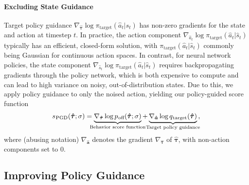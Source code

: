 \documentclass[10pt]{article} %
\theoremstyle{plain}
\theoremstyle{definition}
\theoremstyle{remark}
\newcommand{\qtarg}{q_{\mkern1mu\text{target}}}
\newcommand{\poff}{p_{\mkern1mu\text{off}}}
\begin{document}
\paragraph{Excluding State Guidance}
Target policy guidance $\nabla_{\bm{\hat{\tau}}}\log \pi_{\text{target}}\left(\hat{a}_t|\hat{s}_t\right)$ has non-zero gradients for the state and action at timestep $t$.
In practice, the action component $\nabla_{\hat{a}_t} \log \pi_{\text{target}}\left(\hat{a}_t|\hat{s}_t\right)$ typically has an efficient, closed-form solution, with $\pi_{\text{target}}\left(\hat{a}_t|\hat{s}_t\right)$ commonly being Gaussian for continuous action spaces. In contrast, for neural network policies, the state component $\nabla_{\hat{s}_t} \log \pi_{\text{target}}\left(\hat{a}_t|\hat{s}_t\right)$ requires backpropagating gradients through the policy network, which is both expensive to compute and can lead to high variance on noisy, out-of-distribution states.
Due to this, we apply policy guidance to only the noised action, yielding our policy-guided score function
\begin{align}
    s_{\mkern 1mu \text{PGD}}(\bm{\hat{\tau}};\sigma) = \underbrace{\nabla_{\bm{\hat{\tau}}}\log \poff(\bm{\hat{\tau}};\sigma)}_{\mathclap{\text{Behavior score function}}} + \underbrace{\nabla_{\bm{\hat{a}}} \log \qtarg(\bm{\hat{\tau}})}_{\mathclap{\text{Target policy guidance}}} \text{,} \label{eq:pgd-score}
\end{align}
where (abusing notation) $\nabla_{\bm{\hat{a}}}$ denotes the gradient $\nabla_{\bm{\hat{\tau}}}$ of $\bm{\hat{\tau}}$, with non-action components set to 0.






\subsection{\label{sec:stable-guidance}Improving Policy Guidance}
\end{document}
